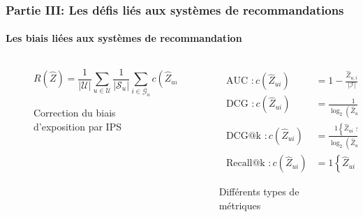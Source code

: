 \begin{frame}

    \frametitle{Partie III: Les défis liés aux systèmes de recommandations}
    \framesubtitle{Les biais liées aux systèmes de recommandation}

    \begin{columns}
        \begin{column}{0.5\textwidth}
            \begin{figure}
                \begin{equation*}
                    R(\hat{Z})=\frac{1}{|\mathcal{U}|} \sum_{u \in \mathcal{U}} \frac{1}{\left|\mathcal{S}_u\right|} \sum_{i \in \mathcal{G}_u} c\left(\hat{Z}_{u i}\right)
                \end{equation*}
                \caption{Correction du biais d'exposition par IPS}
            \end{figure}
        \end{column}

        \begin{column}{0.5\textwidth}
            \begin{figure}
                \begin{equation*}
                    \begin{aligned}
                        \text { AUC }: c\left(\hat{Z}_{u i}\right)      & =1-\frac{\hat{Z}_{u, i}}{|\mathcal{I}|}                                           \\
                        \text { DCG }: c\left(\hat{Z}_{u i}\right)      & =\frac{1}{\log _2\left(\hat{Z}_{u i}+1\right)}                                    \\
                        \text { DCG@k }: c\left(\hat{Z}_{u i}\right)    & =\frac{1\left\{\hat{Z}_{u i} \leq k\right\}}{\log _2\left(\hat{Z}_{u i}+1\right)} \\
                        \text { Recall@k }: c\left(\hat{Z}_{u i}\right) & =1\left\{\hat{Z}_{u i} \leq k\right\}
                    \end{aligned}
                \end{equation*}
                \caption{Différents types de métriques}
            \end{figure}
        \end{column}

    \end{columns}

\end{frame}

